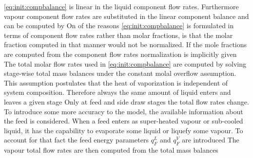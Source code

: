         \eqref{eq:init:compbalance} is linear in the liquid component flow rates. Furthermore vapour component
        flow rates are substituted in the linear component balance and can be computed by
        On of the reasons \eqref{eq:init:compbalance} is formulated in terms of component flow rates rather
        than molar fractions, is that the molar fraction computed in that manner would not be normalized. If
        the mole fractions are computed from the component flow rates normalization is implicitly given
        The total molar flow rates used in \eqref{eq:init:compbalance} are computed by solving
        stage-wise total mass balances under the constant molal overflow assumption. This assumption
        postulates that the heat of vaporization is independent of system composition.
        Therefore always the same amount of liquid enters and leaves a given stage
        Only at feed and side draw stages the total flow rates change. To introduce some more accuracy
        to the model, the available information about the feed is considered. When a feed enters as
        super-heated vapour or sub-cooled liquid, it has the capability to evaporate some liquid or
        liquefy some vapour. To account for that fact the feed energy parameters $q_F^L$ and $q_F^V$
        are introduced
        The vapour total flow rates are then computed from the total mass balances
